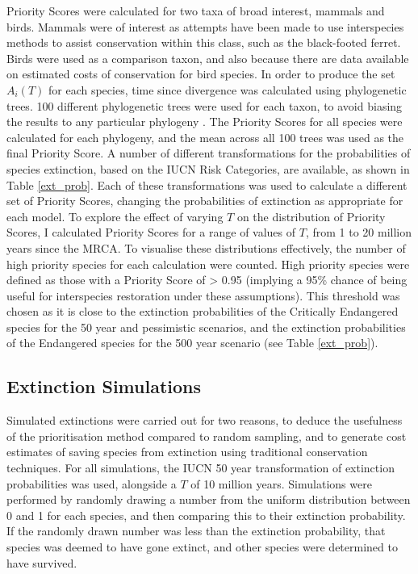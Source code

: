 \documentclass[12pt]{article}
\begin{document}
	Priority Scores were calculated for two taxa of broad interest,
	mammals and birds. Mammals were of interest as attempts have been made to use
	interspecies methods to assist conservation within this class, such as the
	black-footed ferret. Birds were used as a comparison taxon, and also because there are data
	available on estimated costs of conservation for bird species. In order to produce the set $A_i(T)$
	for each species, time since divergence was calculated using phylogenetic
	trees. 100 different phylogenetic trees were used for each taxon, to avoid biasing the results to any
	particular phylogeny 
	\citep{uphamInferringMammalTree2019,jetzGlobalDiversityBirds2012}. %
	The Priority Scores for all species were calculated for each phylogeny,
	and the mean across all 100 trees was used as the final
	Priority Score. A number of different transformations for the probabilities of species
	extinction, based on the IUCN Risk Categories, are available, as shown in Table \ref{ext_prob}.
	Each of these transformations was used to
	calculate a different set of Priority Scores, changing the probabilities of extinction as
	appropriate for each model. To explore the effect of varying $T$ on the distribution of Priority
	Scores, I calculated Priority Scores for a range of values of $T$, from 1
	to 20 million years since the MRCA. To visualise these distributions effectively,
	the number of high priority species for each calculation were counted. High priority
	species were defined as those with a Priority Score of > 0.95 (implying a 95\%
	chance of being useful for interspecies restoration under these assumptions).
	This threshold was chosen as it is close to the extinction probabilities
	of the Critically Endangered species for the 50 year and pessimistic scenarios,
	and the extinction probabilities of the Endangered species for the 500 year
	scenario (see Table \ref{ext_prob}).
	
	\subsection{Extinction Simulations}\label{sim_methods}
	Simulated extinctions were carried out for two reasons, to deduce the usefulness of the prioritisation
	method compared to random sampling, and to generate cost estimates of saving species from
	extinction using traditional conservation techniques. For all simulations, the IUCN 50
	year transformation of extinction probabilities \citep{mooersConvertingEndangeredSpecies2008} was used, alongside
	a $T$ of 10 million years. Simulations were performed by randomly drawing a number from the 
	uniform distribution between 0 and 1 for each species,
	and then comparing this to their extinction probability. If the randomly drawn number 
	was less than the extinction probability, that species was deemed to have gone extinct, and other species were determined to have survived.
	
\end{document}
